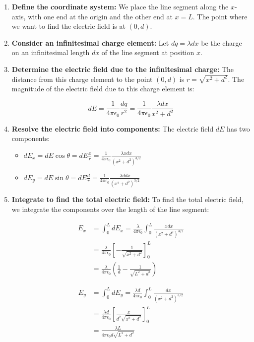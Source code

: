 \documentclass{article}
\begin{document}
\begin{enumerate}
\item \textbf{Define the coordinate system:}  We place the line segment along the \(x\)-axis, with one end at the origin and the other end at \(x = L\). The point where we want to find the electric field is at \((0, d)\).

\item \textbf{Consider an infinitesimal charge element:} Let \(dq = \lambda dx\) be the charge on an infinitesimal length \(dx\) of the line segment at position \(x\).

\item \textbf{Determine the electric field due to the infinitesimal charge:} The distance from this charge element to the point \((0, d)\) is \(r = \sqrt{x^2 + d^2}\). The magnitude of the electric field due to this charge element is:
    
    \[dE = \frac{1}{4\pi\epsilon_0} \frac{dq}{r^2} = \frac{1}{4\pi\epsilon_0} \frac{\lambda dx}{x^2 + d^2}\]

\item \textbf{Resolve the electric field into components:} The electric field \(dE\) has two components:
    \begin{itemize}
    \item \(dE_x = dE \cos \theta = dE \frac{x}{r} = \frac{1}{4\pi\epsilon_0} \frac{\lambda x dx}{(x^2 + d^2)^{3/2}}\)
    \item \(dE_y = dE \sin \theta = dE \frac{d}{r} = \frac{1}{4\pi\epsilon_0} \frac{\lambda d dx}{(x^2 + d^2)^{3/2}}\)
    \end{itemize}

\item \textbf{Integrate to find the total electric field:} To find the total electric field, we integrate the components over the length of the line segment:

    \begin{align*}
    E_x &= \int_0^L dE_x = \frac{\lambda}{4\pi\epsilon_0} \int_0^L \frac{x dx}{(x^2 + d^2)^{3/2}} \\
    &= \frac{\lambda}{4\pi\epsilon_0} \left[-\frac{1}{\sqrt{x^2 + d^2}}\right]_0^L \\
    &= \frac{\lambda}{4\pi\epsilon_0} \left(\frac{1}{d} - \frac{1}{\sqrt{L^2 + d^2}}\right)
    \end{align*}

    \begin{align*}
    E_y &= \int_0^L dE_y = \frac{\lambda d}{4\pi\epsilon_0} \int_0^L \frac{dx}{(x^2 + d^2)^{3/2}} \\
    &= \frac{\lambda d}{4\pi\epsilon_0} \left[\frac{x}{d^2 \sqrt{x^2 + d^2}}\right]_0^L \\
    &= \frac{\lambda L}{4\pi\epsilon_0 d \sqrt{L^2 + d^2}}
    \end{align*}


\end{enumerate}
\end{document}
